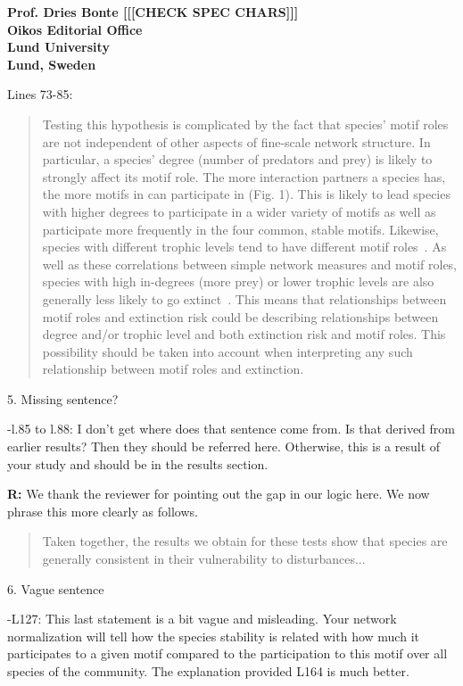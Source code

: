 \documentclass[12pt]{letter}
\begin{document}
\begin{letter}{\bf Prof. Dries Bonte [[[CHECK SPEC CHARS]]]\\
Oikos Editorial Office \\
Lund University \\
Lund, Sweden}
        
        Lines 73-85:
      
        \begin{quotation}
            Testing this hypothesis is complicated by the fact that species' motif roles are not independent of other aspects of fine-scale network structure. 
            In particular, a species' degree (number of predators and prey) is likely to strongly affect its motif role.
            The more interaction partners a species has, the more motifs in can participate in (Fig. 1).
            This is likely to lead species with higher degrees to participate in a wider variety of motifs as well as participate more frequently in the four common, stable motifs.
            Likewise, species with different trophic levels tend to have different motif roles~\citep{Cirtwill2018EcolLett}.
            As well as these correlations between simple network measures and motif roles, species with high in-degrees (more prey) or lower trophic levels are also generally less likely to go extinct~\citep{Cirtwill2018FoodWebs}.
            This means that relationships between motif roles and extinction risk could be describing relationships between degree and/or trophic level and both extinction risk and motif roles.
            This possibility should be taken into account when interpreting any such relationship between motif roles and extinction.
        \end{quotation}
      

    5. Missing sentence?

      -l.85 to l.88: I don't get where does that sentence come from. Is that derived from earlier results? Then they should be referred here. Otherwise, this is a result of your study and should be in the results section.

      \textbf{R:} 
     We thank the reviewer for pointing out the gap in our logic here. We now phrase this more clearly as follows.
      
     \begin{quotation}
         Taken together, the results we obtain for these tests show that species are generally consistent in their vulnerability to disturbances...
     \end{quotation}



    6. Vague sentence

      -L127: This last statement is a bit vague and misleading. Your network normalization will tell how the species stability is related with how much it participates to a given motif compared to the participation to this motif over all species of the community. The explanation provided L164 is much better.


\end{letter}
\end{document}
